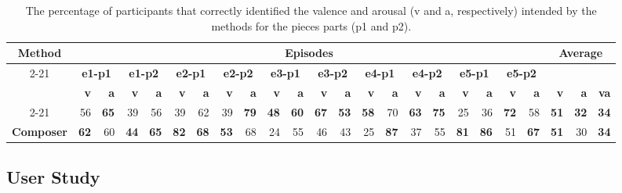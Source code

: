 \begin{table*}[!t]
\centering
\setlength{\tabcolsep}{4pt}
\begin{tabular}{crrrrrrrrrrrrrrrrrrrrrrr}
\toprule
\multirow{3}{*}{\textbf{Method}} & \multicolumn{20}{c}{\textbf{Episodes}} & \multicolumn{3}{c}{\multirow{3}{*}{\textbf{Average}}} \\
\cmidrule{2-21}
& \multicolumn{2}{c}{\textbf{e1-p1}} & \multicolumn{2}{c}{\textbf{e1-p2}} & \multicolumn{2}{c}{\textbf{e2-p1}} & \multicolumn{2}{c}{\textbf{e2-p2}} & \multicolumn{2}{c}{\textbf{e3-p1}} & \multicolumn{2}{c}{\textbf{e3-p2}} & \multicolumn{2}{c}{\textbf{e4-p1}} & \multicolumn{2}{c}{\textbf{e4-p2}} & \multicolumn{2}{c}{\textbf{e5-p1}} & \multicolumn{2}{c}{\textbf{e5-p2}} \\
& \textbf{v} & \textbf{a} & \textbf{v} & \textbf{a} & \textbf{v} & \textbf{a} & \textbf{v} & \textbf{a} & \textbf{v} & \textbf{a} & \textbf{v} & \textbf{a} & \textbf{v} & \textbf{a} & \textbf{v} & \textbf{a} & \textbf{v} & \textbf{a} & \textbf{v} & \textbf{a} & \textbf{v} & \textbf{a} & \textbf{va}\\
\cmidrule{2-21}
\multicolumn{1}{l}{\textbf{Baseline}} & 56 & \textbf{65} & 39 & 56 & 39 & 62 & 39 & \textbf{79} & \textbf{48} & \textbf{60} & \textbf{67} & \textbf{53} & \textbf{58} & 70 & \textbf{63} & \textbf{75} & 25 & 36 & \textbf{72} & 58 & \textbf{51} & \textbf{32} & \textbf{34}\\
\multicolumn{1}{l}{\textbf{Composer}} & \textbf{62} & 60 & \textbf{44} & \textbf{65} & \textbf{82} & \textbf{68} & \textbf{53} & 68 & 24 & 55 & 46 & 43 & 25 & \textbf{87} & 37 & 55 & \textbf{81} & \textbf{86} & 51 & \textbf{67} & \textbf{51} & 30 & \textbf{34}\\
\bottomrule
\end{tabular}
\caption{The percentage of participants  that  correctly  identified  the valence and arousal (v and a, respectively) intended by the methods for the pieces parts (p1 and p2).
}
\label{tab:user_study}
\end{table*}

\subsection{User Study}


